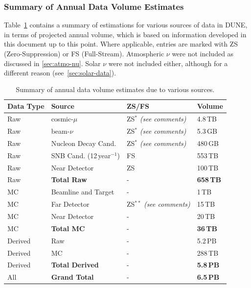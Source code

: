\subsubsection{Summary of Annual Data Volume Estimates}
\label{summary-annual-volume}
Table~\ref{tab:summary-data-table} contains a summary of estimations for various sources
of data in DUNE, in terms of projected annual volume, which is based on information developed in
this document up to this point. Where applicable, entries are marked with ZS (Zero-Suppression) or
FS (Full-Stream). Atmospheric $\nu$ were not included as discussed in \ref{sec:atmo-nu}. Solar $\nu$ were not
included either, although for a different reason (see~\ref{sec:solar-data}).
\begin{table}[ht!]
	\centering
	\begin{tabular}{| p{1.2in}| p{1.73in} | p{1.5in} | p{0.62in} |}
		\hline
		\textbf{Data Type} & \textbf{Source} & \textbf{ZS/FS} & \textbf{Volume} \\ \hline
		Raw & cosmic-$\mu$  & ZS$^*$ \textit{(see comments)}& 4.8\,TB \\	\hline
		Raw & beam-$\nu$  & ZS$^*$ \textit{(see comments)}& 5.3\,GB  \\	\hline
		Raw & Nucleon Decay Cand.  & ZS$^*$ \textit{(see comments)}& 480\,GB  \\	\hline
		Raw & SNB Cand. (12\,year$^{-1}$) & FS & 553\,TB \\	\hline \hline %
		Raw & Near Detector & ZS & 100\,TB \\	\hline \hline \hline
		Raw & \textbf{Total Raw} & - & \textbf{658\,TB} \\		\hline \hline \hline
		MC & Beamline and Target  & - & 1\,TB \\	\hline
		MC & Far Detector & ZS$^{**}$  \textit{(see comments)}  & 15\,TB \\		\hline
		MC & Near Detector & - &20\,TB \\ \hline \hline \hline
		MC & \textbf{Total MC} & - & \textbf{36\,TB} \\		\hline \hline \hline
		Derived &  Raw  & - & 5.2\,PB \\	\hline
		Derived &  MC  & - & 288\,TB \\	\hline  \hline \hline
		Derived & \textbf{Total Derived} & - & \textbf{5.8\,PB} \\		\hline \hline \hline
		All & \textbf{Grand Total} & - & \textbf{6.5\,PB} \\		\hline %
	\end{tabular}
	\caption{Summary of annual data volume estimates due to various sources.}
	\label{tab:summary-data-table}
\end{table}

